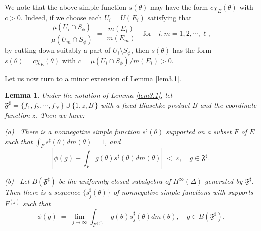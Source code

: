 \documentclass[12pt]{amsart}
\theoremstyle{plain}
\newtheorem{lem}{Lemma}[section]
\numberwithin{equation}{section}
\begin{document}
We note that the above simple function $s(\theta)$ may
have the form $c \chi_{E}(\theta)$ with $c > 0$.
Indeed, if we choose each $U_i=U(E_i)$ satisfying that
$$
\frac{\mu(U_i\cap S_\phi)}{\mu(U_m\cap S_\phi)}\;=\;
\frac{m(E_i)}{m(E_m)} \quad \text{for}\quad i, m = 1, 2,\cdots, \ell,
$$
by cutting down suitably a part of $U_i\setminus S_\phi$, then
$s(\theta)$ has the form $s(\theta)=c \chi_{E}(\theta)$ with
$c = \mu(U_i\cap S_\phi)/m(E_i) > 0$.

\medskip
Let us now turn to a minor extension of Lemma \ref{lem3.1}.
\begin{lem}
\label{lem3.2}
Under the notation of Lemma \ref{lem3.1}, let \,$\mathfrak{F}^\sharp
= \{f_1, f_2, \cdots, f_N\,\}\cup \{1, z, B \,\}$ with
a fixed Blaschke product $B$ and the coordinate function $z$.
Then we have:

\smallskip
\noindent
{\rm (a)} \, There is a nonnegative simple function $s^\sharp(\theta)$
supported on a subset $F$ of $E$ such that $\int_F s^\sharp(\theta) dm(\theta)=1$,
and
\begin{equation}
\left \vert \phi(g) - \int_F g(\theta)s^\sharp(\theta) dm(\theta) \right \vert
\;<\; \varepsilon, \quad g \in \mathfrak{F}^\sharp.
\label{eq3.2}
\end{equation}

\noindent
{\rm (b)} \, Let $B(\mathfrak{F}^\sharp)$ be the uniformly closed subalgebra
of $H^\infty(\Delta)$ generated by $\mathfrak{F}^\sharp$.
Then there is a sequence $\{s^\sharp_j(\theta)\}$ of nonnegative simple
functions with supports $F^{(j)}$ such that
\begin{equation}
\label{eq3.3}
\phi(g) \;=\; \lim_{j \to \infty}\int_{F^{(j)}}\,
g(\theta)s^\sharp_j(\theta)dm(\theta),
\quad g \in B(\mathfrak{F}^\sharp).
\end{equation}
\end{lem}
\end{document}
